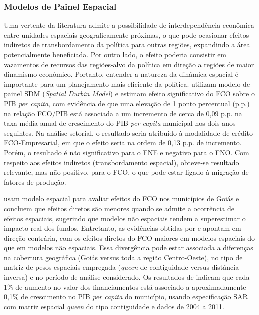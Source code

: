 \subsubsection{Modelos de Painel Espacial}

Uma vertente da literatura admite a possibilidade de interdependência econômica entre unidades espaciais geograficamente próximas, o que pode ocasionar efeitos indiretos de transbordamento da política para outras regiões, expandindo a área potencialmente beneficiada. Por outro lado, o efeito poderia consistir em vazamentos de recursos das regiões-alvo da política em direção a regiões de maior dinamismo econômico. Portanto, entender a natureza da dinâmica espacial é importante para um planejamento mais eficiente da política.  utilizam modelo de painel SDM (\textit{Spatial Durbin Model}) e estimam efeito significativo do FCO sobre o PIB \textit{per capita}, com evidência de que uma elevação de 1 ponto percentual (p.p.) na relação FCO/PIB está associada a um incremento de cerca de 0,09 p.p. na taxa média anual de crescimento do PIB \textit{per capita} municipal nos dois anos seguintes. Na análise setorial, o resultado seria atribuído à modalidade de crédito FCO-Empresarial, em que o efeito seria na ordem de 0,13 p.p. de incremento. Porém, o resultado é não significativo para o FNE e negativo para o FNO. Com respeito aos efeitos indiretos (transbordamento espacial), obteve-se resultado relevante, mas não positivo, para o FCO, o que pode estar ligado à migração de fatores de produção.

 usam modelo espacial para avaliar efeitos do FCO nos municípios de Goiás e concluem que efeitos diretos são menores quando se admite a ocorrência de efeitos espaciais, sugerindo que modelos não espaciais tendem a superestimar o impacto real dos fundos. Entretanto, as evidências obtidas por  e  apontam em direção contrária, com os efeitos diretos do FCO maiores em modelos espaciais do que em modelos não espaciais. Essa divergência pode estar associada a diferenças na cobertura geográfica (Goiás versus toda a região Centro-Oeste), no tipo de matriz de pesos espaciais empregada (\textit{queen} de contiguidade versus distância inversa) e no período de análise considerado. Os resultados de  indicam que cada 1\% de aumento no valor dos financiamentos está associado a aproximadamente 0,1\% de crescimento no PIB \textit{per capita} do município, usando especificação SAR com matriz espacial \textit{queen} do tipo contiguidade e dados de 2004 a 2011.

